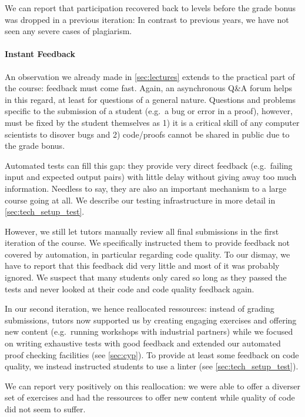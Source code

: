 We can report that participation recovered
back to levels before the grade bonus was dropped in a previous iteration:
In contrast to previous years,
we have not seen any severe cases of plagiarism.

\paragraph{Instant Feedback}
An observation we already made in \cref{sec:lectures}
extends to the practical part of the course:
feedback must come fast.
Again, an asynchronous Q\&A forum helps in this regard,
at least for questions of a general nature.
Questions and problems specific to the submission of a student (e.g.\ a bug or error in a proof),
however, must be fixed by the student themselves as 1) it is a critical skill of any computer scientists to disover bugs and 2) code/proofs cannot be shared in public due to the grade bonus.

Automated tests can fill this gap:
they provide very direct feedback (e.g.\ failing input and expected output pairs) with little delay
without giving away too much information.
Needless to say, they are also an important mechanism
to a large course going at all.
We describe our testing infrastructure in more detail in \cref{sec:tech_setup_test}.

However, we still let tutors manually review all final submissions
in the first iteration of the course.
We specifically instructed them to provide feedback not covered by automation,
in particular regarding code quality.
To our dismay, we have to report that this feedback did very little and
most of it was probably ignored.
We suspect that many students only cared so long as they passed the tests
and never looked at their code and code quality feedback again.

In our second iteration, we hence reallocated ressources:
instead of grading submissions,
tutors now supported us by creating engaging exercises
and offering new content (e.g.\ running workshops with industrial partners)
while we focused on writing exhaustive tests with good feedback and extended our automated proof checking facilities (see \cref{sec:cyp}).
To provide at least some feedback on
code quality, we instead instructed students
to use a linter (see \cref{sec:tech_setup_test}).

We can report very positively on this reallocation:
we were able to offer a diverser set of exercises and
had the ressources to offer new content
while quality of code did not seem to suffer.

